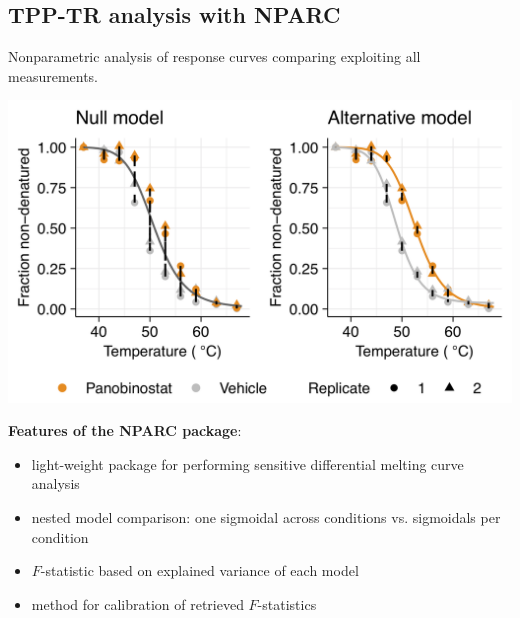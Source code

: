 \documentclass{article}
\newcommand{\hcode}[2][lgray]{{\ttfamily\color{vdgray}\colorbox{#1}{#2}}}
\begin{document}
\begin{multicols}{2}
\begin{minipage}[t]{\linewidth}
  \section*{\huge TPP-TR analysis with \hcode{NPARC} \cite{childs_2019}}
  Nonparametric analysis of response curves comparing exploiting all measurements.  

  \begin{minipage}{0.6\linewidth}
  \includegraphics[width=\linewidth]{figs/nparc-tr_example_new.png}
  \end{minipage}%
  \begin{minipage}{0.4\linewidth}
  \textbf{Features of the \hcode{NPARC} package}:
% 
  \begin{itemize}
%
  \item light-weight package for performing sensitive differential melting curve analysis
  \item nested model comparison: one sigmoidal across conditions vs. sigmoidals per condition
  \item $F$-statistic based on explained variance of each model
  \item method for calibration of retrieved $F$-statistics
%
  \end{itemize}
  \end{minipage}
\end{minipage}


\noindent
\begin{minipage}[t]{\linewidth}
  \vspace{0.55cm}

\end{minipage}
\end{multicols}
\end{document}
